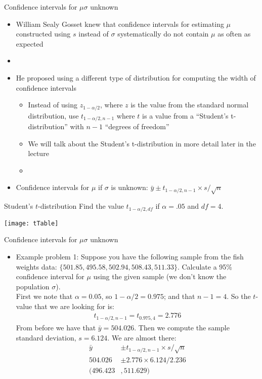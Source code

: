 \documentclass[xcolor=dvipsnames]{beamer}
\begin{document}
\begin{frame}{Confidence intervals for $\mu$}{$\sigma$ unknown}
	\begin{itemize}
		\item William Sealy Gosset knew that confidence intervals for estimating $\mu$ constructed using $s$ instead of $\sigma$ systematically do not contain $\mu$ as often as expected
		\item[]
		\item He proposed using a different type of distribution for computing the width of confidence intervals
		\begin{itemize}
			\item Instead of using $z_{1-\alpha / 2}$, where $z$ is the value from the standard normal distribution, use $t_{1-\alpha / 2, n - 1}$ where $t$ is a value from a ``Student's t-distribution'' with $n-1$ ``degrees of freedom''
			\item We will talk about the Student's t-distribution in more detail later in the lecture
				\item[]
		\end{itemize}
			\item Confidence intervals for $\mu$ if $\sigma$ is unknown: $\bar{y} \pm t_{1-\alpha / 2, n - 1} \times s / \sqrt{n}$
	\end{itemize}
\end{frame}

\begin{frame}{Student's $t$-distribution}
	Find the value $t_{1-\alpha / 2, df}$ if $\alpha = .05$ and $df = 4$. 
	\begin{center}
		\texttt{[image: tTable]}
	\end{center}
\end{frame}

\begin{frame}{Confidence intervals for $\mu$}{$\sigma$ unknown}
	\begin{itemize}
		\item Example problem 1: Suppose you have the following sample from the fish weights data: $\{501.85, 495.58, 502.94, 508.43, 511.33\}$. Calculate a 95\% confidence interval for $\mu$ using the given sample (we don't know the population $\sigma$). \\
		\vspace{10 pt}
		First we note that $\alpha = 0.05$, so $1-\alpha / 2 = 0.975$; and that $n - 1 = 4$. So the $t$-value that we are looking for is:
		\begin{gather*}
			t_{1-\alpha / 2, n - 1} = t_{0.975, 4} = 2.776
		\end{gather*}
		From before we have that $\bar{y}=504.026$. Then we compute the sample standard deviation, $s = 6.124$. We are almost there:
		\begin{align*}
			\bar{y} &\pm t_{1-\alpha / 2, n - 1} \times s / \sqrt{n} \\
			504.026 &\pm 2.776 \times 6.124 / 2.236 \\
			(496.423&, 511.629)
		\end{align*}
	\end{itemize}
\end{frame}
\end{document}
